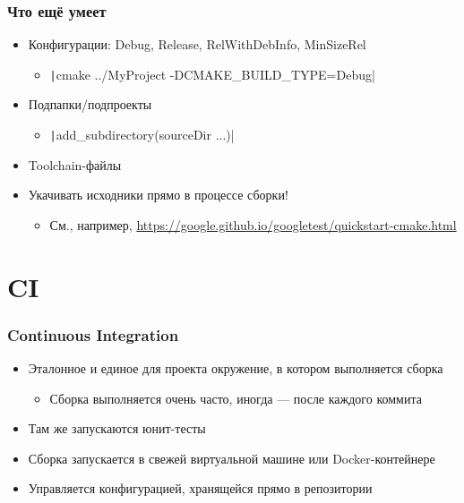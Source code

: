 \documentclass{../../slides-style}
\begin{document}
    \begin{frame}
        \frametitle{Что ещё умеет}
        \begin{itemize}
            \item Конфигурации: Debug, Release, RelWithDebInfo, MinSizeRel
            \begin{itemize}
                \item \texttt|cmake ../MyProject -DCMAKE_BUILD_TYPE=Debug|
            \end{itemize}
            \item Подпапки/подпроекты
            \begin{itemize}
                \item \texttt|add_subdirectory(sourceDir ...)|
            \end{itemize}
            \item Toolchain-файлы
            \item Укачивать исходники прямо в процессе сборки!
            \begin{itemize}
                \item См., например, \url{https://google.github.io/googletest/quickstart-cmake.html}
            \end{itemize}
        \end{itemize}
    \end{frame}

    \section{CI}

    \begin{frame}
        \frametitle{Continuous Integration}
        \begin{itemize}
            \item Эталонное и единое для проекта окружение, в котором выполняется сборка
            \begin{itemize}
                \item Сборка выполняется очень часто, иногда --- после каждого коммита
            \end{itemize}
            \item Там же запускаются юнит-тесты
            \item Сборка запускается в свежей виртуальной машине или Docker-контейнере
            \item Управляется конфигурацией, хранящейся прямо в репозитории
        \end{itemize}
    \end{frame}
\end{document}
